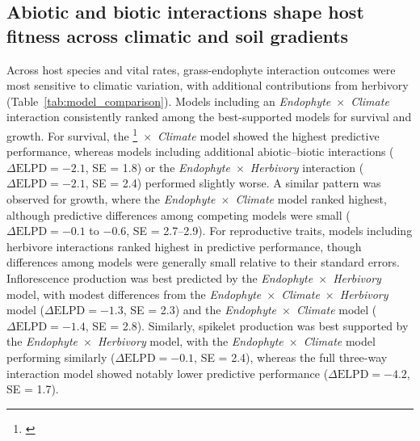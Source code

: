 \documentclass[12pt]{article}\usepackage[]{graphicx}\usepackage[dvipsnames]{xcolor}
\newcommand{\tom}[2]{{\color{red}{#1}}\footnote{\textit{\color{red}{#2}}}}
\begin{document}
\subsection*{Abiotic and biotic interactions shape host fitness across climatic and soil gradients}
Across host species and vital rates, grass-endophyte interaction outcomes were most sensitive to climatic variation, with additional contributions from herbivory (Table~\ref{tab:model_comparison}). 
Models including an \textit{Endophyte}~$\times$~\textit{Climate} interaction consistently ranked among the best-supported models for survival and growth.
For survival, the \tom{\textit{Endophyte}}{In the table you call this ``Symbiont''}~$\times$~\textit{Climate} model showed the highest predictive performance, whereas models including additional abiotic–biotic interactions ($\Delta \mathrm{ELPD} = -2.1$, SE = 1.8) or the \textit{Endophyte}~$\times$~\textit{Herbivory} interaction ($\Delta \mathrm{ELPD} = -2.1$, SE = 2.4) performed slightly worse. 
A similar pattern was observed for growth, where the \textit{Endophyte}~$\times$~\textit{Climate} model ranked highest, although predictive differences among competing models were small ($\Delta \mathrm{ELPD} = -0.1$ to $-0.6$, SE = 2.7–2.9).
For reproductive traits, models including herbivore interactions ranked highest in predictive performance, though differences among models were generally small relative to their standard errors. 
Inflorescence production was best predicted by the \textit{Endophyte}~$\times$~\textit{Herbivory} model, with modest differences from the \textit{Endophyte}~$\times$~\textit{Climate}~$\times$~\textit{Herbivory} model ($\Delta \mathrm{ELPD} = -1.3$, SE = 2.3) and the \textit{Endophyte}~$\times$~\textit{Climate} model 
($\Delta \mathrm{ELPD} = -1.4$, SE = 2.8).
Similarly, spikelet production was best supported by the \textit{Endophyte}~$\times$~\textit{Herbivory} model, with the \textit{Endophyte}~$\times$~\textit{Climate} model performing similarly ($\Delta \mathrm{ELPD} = -0.1$, SE = 2.4), whereas the full three-way interaction model showed notably lower predictive performance ($\Delta \mathrm{ELPD} = -4.2$, SE = 1.7).
\end{document}
